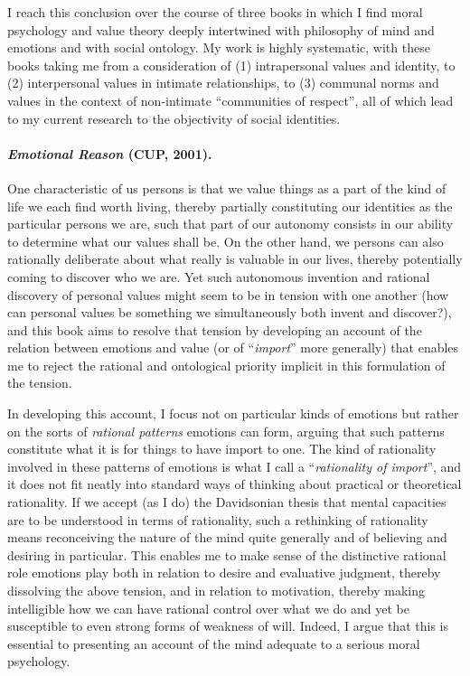 \documentclass[%
  11pt,%
]{article}
\begin{document}
I reach this conclusion over the course of three books in which I find moral psychology and value theory deeply intertwined with philosophy of mind and emotions and with social ontology. My work is highly systematic, with these books taking me from a consideration of (1) intrapersonal values and identity, to (2) interpersonal values in intimate relationships, to (3) communal norms and values in the context of non-intimate \enquote{communities of respect}, all of which lead to my current research to the objectivity of social identities.

\paragraph{\emph{Emotional Reason} (CUP, 2001).}

One characteristic of us persons is that we value things as a part of the kind of life we each find worth living, thereby partially constituting our identities as the particular persons we are, such that part of our autonomy consists in our ability to determine what our values shall be. On the other hand, we persons can also rationally deliberate about what really is valuable in our lives, thereby potentially coming to discover who we are. Yet such autonomous invention and rational discovery of personal values might seem to be in tension with one another (how can personal values be something we simultaneously both invent and discover?), and this book aims to resolve that tension by developing an account of the relation between emotions and value (or of \enquote{\emph{import}} more generally) that enables me to reject the rational and ontological priority implicit in this formulation of the tension.

In developing this account, I focus not on particular kinds of emotions but rather on the sorts of \emph{rational patterns} emotions can form, arguing that such patterns constitute what it is for things to have import to one. The kind of rationality involved in these patterns of emotions is what I call a \enquote{\emph{rationality of import}}, and it does not fit neatly into standard ways of thinking about practical or theoretical rationality. If we accept (as I do) the Davidsonian thesis that mental capacities are to be understood in terms of rationality, such a rethinking of rationality means reconceiving the nature of the mind quite generally and of believing and desiring in particular. This enables me to make sense of the distinctive rational role emotions play both in relation to desire and evaluative judgment, thereby dissolving the above tension, and in relation to motivation, thereby making intelligible how we can have rational control over what we do and yet be susceptible to even strong forms of weakness of will. Indeed, I argue that this is essential to presenting an account of the mind adequate to a serious moral psychology.
\end{document}

